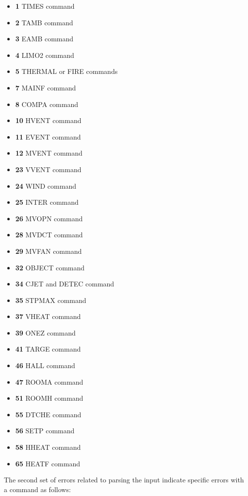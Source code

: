 \begin{itemize}
\item \textbf{1} TIMES command
\item \textbf{2} TAMB command
\item \textbf{3} EAMB command
\item \textbf{4} LIMO2 command
\item \textbf{5} THERMAL or FIRE commands
\item \textbf{7} MAINF command
\item \textbf{8} COMPA command
\item \textbf{10} HVENT command
\item \textbf{11} EVENT command
\item \textbf{12} MVENT command
\item \textbf{23} VVENT command
\item \textbf{24} WIND command
\item \textbf{25} INTER command
\item \textbf{26} MVOPN command
\item \textbf{28} MVDCT command
\item \textbf{29} MVFAN command
\item \textbf{32} OBJECT command
\item \textbf{34} CJET and DETEC command
\item \textbf{35} STPMAX command
\item \textbf{37} VHEAT command
\item \textbf{39} ONEZ command
\item \textbf{41} TARGE command
\item \textbf{46} HALL command
\item \textbf{47} ROOMA command
\item \textbf{51} ROOMH command
\item \textbf{55} DTCHE command
\item \textbf{56} SETP command
\item \textbf{58} HHEAT command
\item \textbf{65} HEATF command
\end{itemize}

The second set of errors related to parsing the input indicate specific errors with a command as follows:

